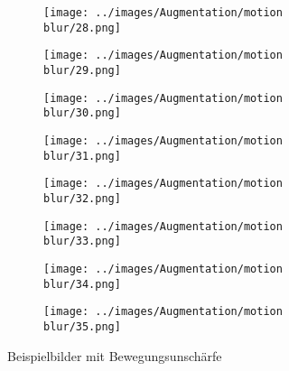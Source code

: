 \begin{figure}[H]
\begin{subfigure}[b]{0.1\textwidth}
 \centering
 \texttt{[image: ../images/Augmentation/motion blur/28.png]}
\end{subfigure}
\hspace{1em}%
\begin{subfigure}[b]{0.1\textwidth}
\centering
\texttt{[image: ../images/Augmentation/motion blur/29.png]}
\end{subfigure}
\hspace{1em}%
\begin{subfigure}[b]{0.1\textwidth}
\centering
\texttt{[image: ../images/Augmentation/motion blur/30.png]}
\end{subfigure}
\hspace{1em}%
\begin{subfigure}[b]{0.1\textwidth}
\centering
\texttt{[image: ../images/Augmentation/motion blur/31.png]}
\end{subfigure}
\hspace{1em}%
\begin{subfigure}[b]{0.1\textwidth}
\centering
\texttt{[image: ../images/Augmentation/motion blur/32.png]}
\end{subfigure}
\hspace{1em}%
\begin{subfigure}[b]{0.1\textwidth}
\centering
\texttt{[image: ../images/Augmentation/motion blur/33.png]}
\end{subfigure}
\hspace{1em}%
\begin{subfigure}[b]{0.1\textwidth}
\centering
\texttt{[image: ../images/Augmentation/motion blur/34.png]}
\end{subfigure}
\hspace{1em}%
\begin{subfigure}[b]{0.1\textwidth}
\centering
\texttt{[image: ../images/Augmentation/motion blur/35.png]}
\end{subfigure}
\caption{Beispielbilder mit Bewegungsunschärfe}
\label{fig:motion-blur-imgs}
\end{figure}

